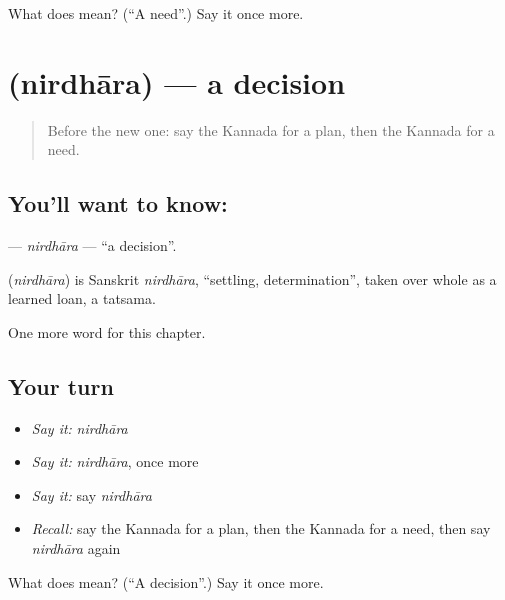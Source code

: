 \begin{tcolorbox}[breakable,colback=teal!4,colframe=teal!35!black,title={Before you move on}]
What does  mean? (\textquotedblleft{}A need\textquotedblright{}.) Say it once more.
\end{tcolorbox}
\section[\texorpdfstring{\kn{ನಿರ್ಧಾರ} (nirdhāra)}{ನಿರ್ಧಾರ (nirdhāra)}]{ (nirdhāra) — a decision}

\label{lesson:KA-C114-nirdhara}



\begin{quote}
Before the new one: say the Kannada for a plan, then the Kannada for a need.
\end{quote}

\subsection*{You'll want to know: }
\textbf{} — \emph{nirdhāra} — \textquotedblleft{}a decision\textquotedblright{}.

\begin{cousinweb}
\textbf{} (\emph{nirdhāra}) is Sanskrit \emph{nirdhāra}, \textquotedblleft{}settling, determination\textquotedblright{}, taken over whole as a learned loan, a tatsama.
\end{cousinweb}

\begin{grammarlens}[title={What you've built}]
One more word for this chapter.
\end{grammarlens}

\subsection*{Your turn}
\begin{itemize}
\raggedright
  \item \emph{Say it:} \emph{nirdhāra}
  \item \emph{Say it:} \emph{nirdhāra}, once more
  \item \emph{Say it:} say \emph{nirdhāra}
  \item \emph{Recall:} say the Kannada for a plan, then the Kannada for a need, then say \emph{nirdhāra} again
\end{itemize}

\begin{tcolorbox}[breakable,colback=teal!4,colframe=teal!35!black,title={Before you move on}]
What does  mean? (\textquotedblleft{}A decision\textquotedblright{}.) Say it once more.
\end{tcolorbox}

